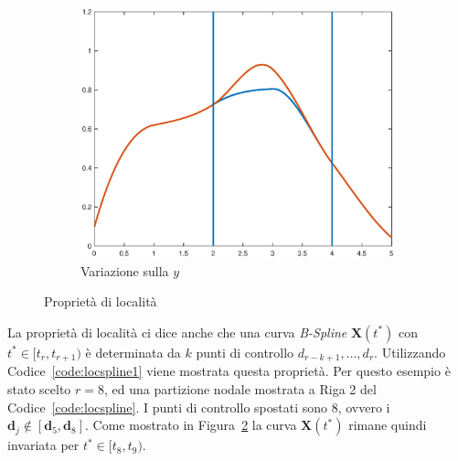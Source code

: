 \documentclass[a4paper, 12pt]{article}
\begin{document}
\begin{figure}[]
\begin{subfigure}[b]{0.3\textwidth}
      \includegraphics[width=\textwidth]{figure/loc1.eps}
      \caption{Variazione sulla $y$}
      \label{fig:loc1}
  \end{subfigure}
  \caption{Proprietà di località}\label{fig:loc_spline1}
\end{figure}

La proprietà di località ci dice anche che una curva \textit{B-Spline} $\mathbf{X}(t^*)$ con $t^* \in [t_r, t_{r+1})$ è determinata da 
$k$ punti di controllo $d_{r-k+1}, \dots, d_{r}$. 
Utilizzando Codice~\ref{code:locspline1} viene mostrata questa proprietà. Per questo esempio è stato scelto
$r = 8$, ed una partizione nodale mostrata a Riga 2 del Codice~\ref{code:locspline}.
I  punti di controllo spostati sono $8$, ovvero i $\mathbf{d}_j \notin [\mathbf{d}_{5}, \mathbf{d}_{8}]$.
Come mostrato in Figura~\ref{fig:loc_spline1} la curva  $\mathbf{X}(t^*)$  rimane quindi invariata per $t^* \in [t_{8}, t_{9})$. 


\end{document}
